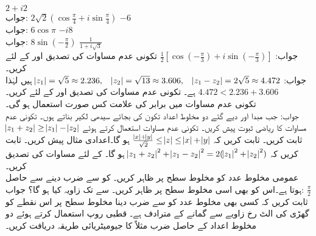 \quad
$2+i2$\\
جواب:\quad
$2\sqrt{2}(\cos \frac{\pi}{4}+i\sin\frac{\pi}{4})$
\quad
$-6$\\
جواب:\quad
$6\cos \pi$
\quad
$-i8$\\
جواب:\quad
$8\sin (-\tfrac{\pi}{2})$
\quad
$\tfrac{1}{1+i\sqrt{3}}$\\
جواب:\quad
$\tfrac{1}{2}[\cos(-\tfrac{\pi}{3})+i\sin(-\tfrac{\pi}{3})]$
\quad
تکونی عدم مساوات کی تصدیق  اور  کے لئے کریں۔\\
جواب:\quad
$\abs{z_1}=\sqrt{5}\approx 2.236,\quad \abs{z_2}=\sqrt{13}\approx 3.606,\quad \abs{z_1-z_2}=2\sqrt{5}\approx 4.472$
ہیں لہٰذا 
$4.472<2.236+3.606$
ہے۔
\quad
تکونی عدم مساوات کی تصدیق  اور  کے لئے کریں۔\\
\quad
تکونی عدم مساوات میں برابر کی علامت کس صورت استعمال ہو گی۔\\
جواب:\quad
جب مبدا اور دیے گئے دو مخلوط اعداد تکون کی بجائے سیدھی لکیر بناتے ہوں۔
\quad
تکونی عدم مساوات کا ریاضی ثبوت پیش کریں۔
\quad
تکونی عدم مساوات استعمال کرتے ہوئے 
$\abs{z_1+z_2}\ge \abs{z_1}-\abs{z_2}$
ثابت کریں۔
\quad
ثابت کریں کہ 
$\tfrac{\abs{x}+\abs{y}}{\sqrt{2}}\le \abs{z}\le \abs{x}+\abs{y}$
ہو گا۔اعدادی مثال پیش کریں۔
\quad
ثابت کریں کہ
$\abs{z_1+z_2}^2+\abs{z_1-z_2}^2=2(\abs{z_1}^2+\abs{z_2}^2)$
ہو گا۔
\quad
{} کے لئے مساوات  کی تصدیق کریں۔
\quad {}\\
عمومی مخلوط عدد  کو مخلوط سطح پر ظاہر کریں۔ کو  سے ضرب دینے سے  حاصل ہوتا ہے۔اس کو بھی اسی مخلوط سطح پر ظاہر کریں۔ سے  تک زاویہ کیا ہو گا؟ 
جواب:\quad 
$\tfrac{\pi}{2}$
\quad {}\\
ثابت کریں کہ کسی بھی مخلوط عدد کو  سے ضرب دینا مخلوط سطح پر اس نقطے کو گھڑی کی الٹ رخ  زاویے سے  گمانے کے مترادف ہے۔
\quad
قطبی روپ استعمال کرتے ہوئے دو مخلوط اعداد  کے حاصل ضرب  مثلاً  کا جیومیٹریائی طریقہ دریافت کریں۔ 

